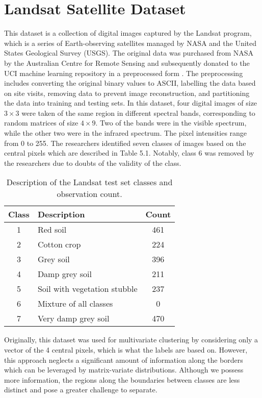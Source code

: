 \documentclass[12pt]{report}
\begin{document}
\section{Landsat Satellite Dataset}
This dataset is a collection of digital images captured by the Landsat program, which is a series of Earth-observing satellites managed by NASA and the United States Geological Survey (USGS). The original data was purchased from NASA by the Australian Centre for Remote Sensing and subsequently donated to the UCI machine learning repository in a preprocessed form \citep{landsat}. The preprocessing includes converting the original binary values to ASCII, labelling the data based on site visits, removing data to prevent image reconstruction, and partitioning the data into training and testing sets. In this dataset, four digital images of size $3 \times 3$ were taken of the same region in different spectral bands, corresponding to random matrices of size $4\times 9$. Two of the bands were in the visible spectrum, while the other two were in the infrared spectrum. The pixel intensities range from 0 to 255. The researchers identified seven classes of images based on the central pixels which are described in Table 5.1. Notably, class 6 was removed by the researchers due to doubts of the validity of the class.
\setcounter{table}{0}
\begin{table}[!htbp]
  \caption{Description of the Landsat test set classes and observation count.}
  \vspace{0.5cm}
  \begin{tabularx}{\textwidth}{cXc}
    \toprule
    \textbf{Class} & \textbf{Description} & \textbf{Count} \\
    \midrule
    1 & Red soil                        & 461 \\
    2 & Cotton crop                     & 224 \\
    3 & Grey soil                       & 396 \\
    4 & Damp grey soil                  & 211 \\
    5 & Soil with vegetation stubble    & 237 \\
    6 & Mixture of all classes          & 0 \\
    7 & Very damp grey soil             & 470 \\
    \bottomrule
  \end{tabularx}
\end{table}

Originally, this dataset was used for multivariate clustering by considering only a vector of the 4 central pixels, which is what the labels are based on. However, this approach neglects a significant amount of information along the borders which can be leveraged by matrix-variate distributions. Although we possess more information, the regions along the boundaries between classes are less distinct and pose a greater challenge to separate.
 
\end{document}
